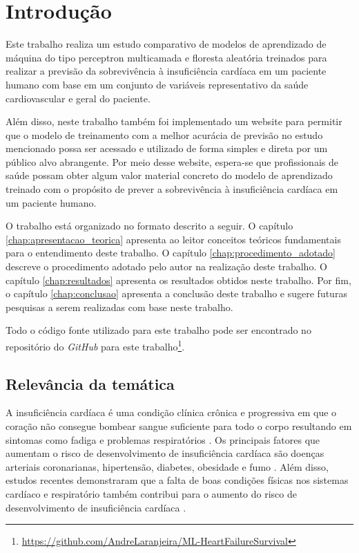\chapter{Introdução} \label{chap:introducao}

Este trabalho realiza um estudo comparativo de modelos de aprendizado de máquina do tipo perceptron multicamada e floresta aleatória treinados para realizar a previsão da sobrevivência à insuficiência cardíaca em um paciente humano com base em um conjunto de variáveis representativo da saúde cardiovascular e geral do paciente.

Além disso, neste trabalho também foi implementado um website para permitir que o modelo de treinamento com a melhor acurácia de previsão no estudo mencionado possa ser acessado e utilizado de forma simples e direta por um público alvo abrangente. Por meio desse website, espera-se que profissionais de saúde possam obter algum valor material concreto do modelo de aprendizado treinado com o propósito de prever a sobrevivência à insuficiência cardíaca em um paciente humano.

O trabalho está organizado no formato descrito a seguir. O capítulo \ref{chap:apresentacao_teorica} apresenta ao leitor conceitos teóricos fundamentais para o entendimento deste trabalho. O capítulo \ref{chap:procedimento_adotado} descreve o procedimento adotado pelo autor na realização deste trabalho. O capítulo \ref{chap:resultados} apresenta os resultados obtidos neste trabalho. Por fim, o capítulo \ref{chap:conclusao} apresenta a conclusão deste trabalho e sugere futuras pesquisas a serem realizadas com base neste trabalho.

Todo o código fonte utilizado para este trabalho pode ser encontrado no repositório do \textit{GitHub} para este trabalho\footnote{\url{https://github.com/AndreLaranjeira/ML-HeartFailureSurvival}}.

\section{Relevância da temática}

A insuficiência cardíaca é uma condição clínica crônica e progressiva em que o coração não consegue bombear sangue suficiente para todo o corpo resultando em sintomas como fadiga e problemas respiratórios \cite{heart_failure_definition}. Os principais fatores que aumentam o risco de desenvolvimento de insuficiência cardíaca são doenças arteriais coronarianas, hipertensão, diabetes, obesidade e fumo \cite[p.399]{heart_disease2021}. Além disso, estudos recentes demonstraram que a falta de boas condições físicas nos sistemas cardíaco e respiratório também contribui para o aumento do risco de desenvolvimento de insuficiência cardíaca \cite[p.62]{heart_disease2021}.

